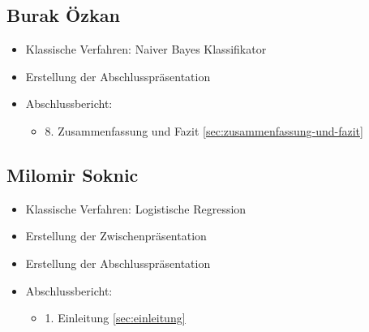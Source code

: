\begin{multicols}{2}
\subsection{Burak Özkan}
\begin{itemize}
    \item Klassische Verfahren: Naiver Bayes Klassifikator
    \item Erstellung der Abschlusspräsentation
    \item Abschlussbericht: 
    \begin{itemize}
        \item 8. Zusammenfassung und Fazit \ref{sec:zusammenfassung-und-fazit}
    \end{itemize}
\end{itemize}

\subsection{Milomir Soknic}
\begin{itemize}
    \item Klassische Verfahren: Logistische Regression
    \item Erstellung der Zwischenpräsentation
    \item Erstellung der Abschlusspräsentation
    \item Abschlussbericht: 
    \begin{itemize}
        \item 1. Einleitung \ref{sec:einleitung}
    \end{itemize}
\end{itemize}

\end{multicols}
